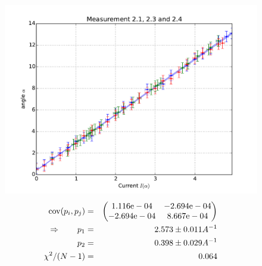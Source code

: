 \begin{figure}
    \begin{centering}
        \includegraphics[width=18cm]{figures/fig_all}
\captionsetup{singlelinecheck=off} 
\caption[.]{
\begin{eqnarray}
    \mathrm{cov}(p_i, p_j) &=& 
    \begin{pmatrix}
        1.116\mathrm{e}-04 &-2.694\mathrm{e}-04 \\
        -2.694\mathrm{e}-04 &8.667\mathrm{e}-04 \\
    \end{pmatrix}
\\ \Rightarrow \qquad
    p_1 &=& 2.573 \pm 0.011 A^{-1}\\
    p_2 &=& 0.398 \pm 0.029 A^{-1} \\ 
    \chi ^2/(N-1) &=& 0.064
\end{eqnarray}
}
    \end{centering}
\end{figure}



